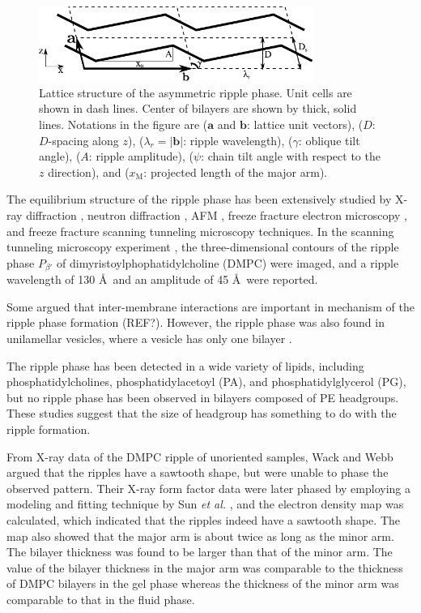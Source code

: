 \begin{figure}[htbp]
  \centering
  \includegraphics[width=0.8\textwidth]{figures/ripple/unit_cell}
  \caption{Lattice structure of the asymmetric ripple phase. Unit cells are shown in
  dash lines. Center of bilayers are shown by thick, solid lines. Notations 
  in the figure are ($\mathbf{a}$ and $\mathbf{b}$: lattice unit vectors),
  ($D$: $D$-spacing along $z$), ($\lambda_r=|\mathbf{b}|$: ripple wavelength), 
  ($\gamma$: oblique tilt angle), ($A$: ripple amplitude),
  ($\psi$: chain tilt angle with respect to the $z$ direction),
  and ($x_\textrm{M}$: projected length of the major arm).}
  \label{fig:unit_cell}
\end{figure}

The equilibrium structure of the ripple phase has been extensively studied by
X-ray diffraction \cite{ref:Janiak76,ref:Janiak79,ref:Tardieu73,ref:Wack89,ref:Yao91,ref:Sun96,ref:Cunningham98},
neutron diffraction \cite{ref:Mortensen88,ref:Bradshaw89}, 
AFM \cite{}, freeze fracture electron microscopy \cite{ref:Woodward96},
and freeze fracture scanning tunneling microscopy \cite{} techniques.
In the scanning tunneling microscopy experiment \cite{ref:Zasadzinski88}, 
the three-dimensional contours of the ripple phase $P_{\beta'}$ of
dimyristoylphophatidylcholine (DMPC) were imaged, and
a ripple wavelength of 130 \AA\ and an amplitude of 45 \AA\ were reported.

Some argued that inter-membrane interactions are important in mechanism of
the ripple phase formation (REF?). However, the ripple phase was also found in
unilamellar vesicles, where a vesicle has only one bilayer 
\cite{ref:Marsh96}.

The ripple phase has been detected in a wide variety of lipids, including
phosphatidylcholines, phosphatidylacetoyl (PA), and phosphatidylglycerol (PG),
but no ripple phase has been observed in bilayers composed of PE headgroups.
These studies suggest that the size of headgroup has something to do with
the ripple formation.

From X-ray data of the DMPC ripple of unoriented samples, 
Wack and Webb \cite{ref:Wack89} argued that the ripples have a sawtooth shape,
but were unable to phase the observed pattern.
Their X-ray form factor data were later
phased by employing a modeling and fitting technique by Sun \textit{et al.}
\cite{ref:Sun96}, and the electron density map was calculated, which indicated that  
the ripples indeed have a sawtooth shape. The map also showed that
the major arm is about twice as long as the minor arm. The bilayer
thickness was found to be larger than that of the minor arm. The
value of the bilayer thickness in the major arm was comparable to the
thickness of DMPC bilayers in the gel phase whereas the thickness
of the minor arm was comparable to that in the fluid phase.

